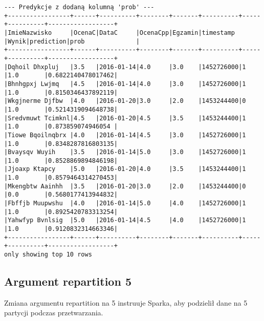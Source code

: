 \documentclass{article}
\begin{document}
\begin{verbatim}
--- Predykcje z dodaną kolumną 'prob' ---
+-----------------+------+----------+--------+-------+----------+-----+----------+------------------+
|ImieNazwisko     |OcenaC|DataC     |OcenaCpp|Egzamin|timestamp |Wynik|prediction|prob              |
+-----------------+------+----------+--------+-------+----------+-----+----------+------------------+
|Dqhoil Dhxpluj   |3.5   |2016-01-14|4.0     |3.0    |1452726000|1    |1.0       |0.6822140478017462|
|Bhnhgpxj Lwjmq   |4.5   |2016-01-14|4.0     |3.0    |1452726000|1    |1.0       |0.8150346437892119|
|Wkgjnerme Djfbw  |4.0   |2016-01-20|3.0     |2.0    |1453244400|0    |1.0       |0.5214319094648738|
|Sredvmuwt Tcimknl|4.5   |2016-01-20|4.5     |3.5    |1453244400|1    |1.0       |0.873859074946054 |
|Tiowe Bqoilnqbrx |4.0   |2016-01-14|4.5     |3.0    |1452726000|1    |1.0       |0.8348287816803135|
|Bvaysqv Wuyih    |3.5   |2016-01-14|5.0     |3.0    |1452726000|1    |1.0       |0.8528869894846198|
|Jjoaxp Ktapcy    |5.0   |2016-01-20|4.0     |3.5    |1453244400|1    |1.0       |0.8579464314270453|
|Mkengbtw Aainhh  |3.5   |2016-01-20|3.0     |2.0    |1453244400|0    |0.0       |0.5680177413944832|
|Fbffjb Muupwshu  |4.0   |2016-01-14|5.0     |4.0    |1452726000|1    |1.0       |0.8925420783313254|
|Yahwfyp Bvnlsig  |5.0   |2016-01-14|4.5     |4.0    |1452726000|1    |1.0       |0.9120832314663346|
+-----------------+------+----------+--------+-------+----------+-----+----------+------------------+
only showing top 10 rows
\end{verbatim}

\subsection{Argument repartition 5}
Zmiana argumentu repartition na 5 instruuje Sparka, aby podzielił dane na 5 partycji podczas przetwarzania.
\end{document}
